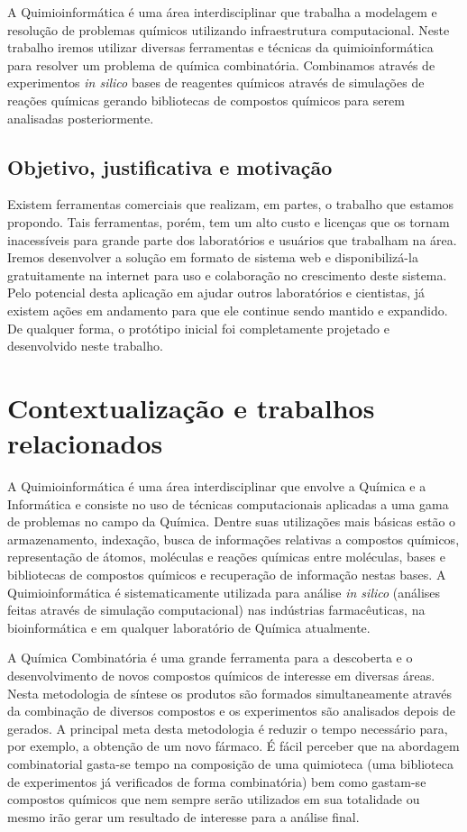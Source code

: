 \documentclass{abnt}
\begin{document}
A Quimioinformática é uma área interdisciplinar que trabalha a modelagem e resolução
de problemas químicos utilizando infraestrutura computacional. Neste trabalho iremos
utilizar diversas ferramentas e técnicas da quimioinformática para resolver um problema
de química combinatória. Combinamos através de experimentos \textit{in silico} bases de
reagentes químicos através de simulações de reações químicas gerando bibliotecas
de compostos químicos para serem analisadas posteriormente.

\section{Objetivo, justificativa e motivação}

Existem ferramentas comerciais que realizam, em partes, o trabalho que estamos propondo.
Tais ferramentas, porém, tem um alto custo e licenças que os tornam inacessíveis
para grande parte dos laboratórios e usuários que trabalham na área. Iremos desenvolver
a solução em formato de sistema web e disponibilizá-la gratuitamente na internet
para uso e colaboração no crescimento deste sistema. Pelo potencial desta aplicação
em ajudar outros laboratórios e cientistas, já existem ações em andamento para que
ele continue sendo mantido e expandido. De qualquer forma, o protótipo inicial foi
completamente projetado e desenvolvido neste trabalho.

\chapter{Contextualização e trabalhos relacionados}

A Quimioinformática\cite{brown1998chemoinformatics} é uma área interdisciplinar que envolve a Química e a Informática
e consiste no uso de técnicas computacionais aplicadas a uma gama de problemas no
campo da Química. Dentre suas utilizações mais básicas estão o armazenamento, indexação,
busca de informações relativas a compostos químicos, representação de átomos, moléculas
e reações químicas entre moléculas, bases e bibliotecas de compostos químicos e
recuperação de informação nestas bases. A Quimioinformática é sistematicamente utilizada
para análise \textit{in silico} (análises feitas através de simulação computacional) nas
indústrias farmacêuticas, na bioinformática e em qualquer laboratório de Química
atualmente.

A Química Combinatória\cite{RBCF43904} é uma grande ferramenta para a descoberta e o desenvolvimento
de novos compostos químicos de interesse em diversas áreas. Nesta metodologia de
síntese os produtos são formados simultaneamente através da combinação de diversos
compostos e os experimentos são analisados depois de gerados. A principal meta desta
metodologia é reduzir o tempo necessário para, por exemplo, a obtenção de um novo
fármaco. É fácil perceber que na abordagem combinatorial gasta-se tempo na composição
de uma quimioteca (uma biblioteca de experimentos já verificados de forma combinatória)
bem como gastam-se compostos químicos que nem sempre serão utilizados em sua totalidade
ou mesmo irão gerar um resultado de interesse para a análise final.
\end{document}
